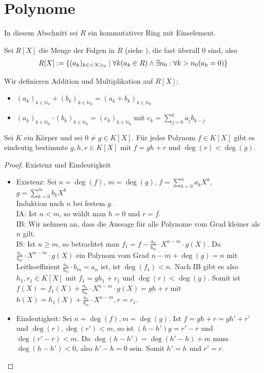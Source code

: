 \section{Polynome}

In diesem Abschnitt sei $R$ ein kommutativer Ring mit Einselement.\\

\begin{definition}[Polynom]
	Sei $R[X]$ die Menge der Folgen in $R$ (siehe ), die fast überall 0 sind, also
	\begin{align}
		R[X]:=\{(a_k)_{k \in \mathbb N_0} \mid \forall k(a_k \in R) \land \exists n_0: \forall k>n_0(a_k=0)\} \notag
	\end{align}
\end{definition}

Wir definieren Addition und Multiplikation auf $R[X]$:
\begin{itemize}
	\item $(a_k)_{k \in \mathbb N_0}+(b_k)_{k \in \mathbb N_0}=(a_k+b_k)_{k \in \mathbb N_0}$
	\item $(a_k)_{k \in \mathbb N_0}\cdot (b_k)_{k \in \mathbb N_0}=(c_k)_{k \in \mathbb N_0}$ mit 
	$c_k = \sum _{j=0}^{k} a_jb_{k-j}$
\end{itemize}

\begin{theorem}[Polynomdivision]
	Sei $K$ ein Körper und sei $0 \neq g \in K[X]$. Für jedes Polynom
	$f \in K[X]$ gibt es eindeutig bestimmte $g,h,r \in K[X]$ mit $f=gh+r$ und $\deg(r)<\deg(g)$. 
\end{theorem}
\begin{proof}
	Existenz und Eindeutigkeit
	\begin{itemize}
		\item Existenz: Sei $n=\deg(f)$, $m=\deg(g)$, $f=\sum _{k=0}^{n} a_kX^k$, $g=\sum _{k=0}^{m} b_kX^k$ \\
		Induktion nach $n$ bei festem $g$. \\
		IA: Ist $n<m$, so wählt man $h=0$ und $r=f$.\\
		IB: Wir nehmen an, dass die Aussage für alle Polynome vom Grad kleiner als $n$ gilt.\\
		IS: Ist $n \ge m$, so betrachtet man $f_1=f-\frac{a_n}{b_m}\cdot X^{n-m}\cdot g(X)$. Da $\frac{a_n}{b_m}\cdot 
		X^{n-m}\cdot g(X)$ ein Polynom vom Grad $n-m+\deg(g)=n$ mit Leitkoeffizient $\frac{a_n}{b_m}\cdot b_m=a_n$ ist, ist
		$\deg(f_1)<n$. Nach IB gibt es also $h_1, r_1 \in K[X]$ mit $f_1=gh_1+r_1$ und $\deg(r)<\deg(g)$. Somit ist 
		$f(X)=f_1(X)+\frac{a_n}{b_m}\cdot X^{n-m}\cdot g(X)=gh+r$ mit $h(X)=h_1(X)+\frac{a_n}{b_m}\cdot X^{n-m}, r=r_1$.
		\item Eindeutigkeit: Sei $n=\deg(f), m=\deg(g)$. Ist $f=gh+r=gh'+r'$ und $\deg(r),\deg(r')<m$, so ist $(h-h')g=r'-r$ und
		$\deg(r'-r)<m$. Da $\deg(h-h')=\deg(h'-h)+m$ muss $\deg(h-h')<0$, also $h'-h=0$ sein. Somit $h'=h$ und $r'=r$.
	\end{itemize}
\end{proof}

